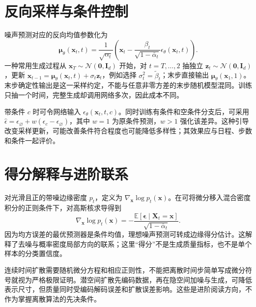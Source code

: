\documentclass[UTF8,12pt,a4paper,fontset=fandol]{ctexbook}
\begin{document}
\section{反向采样与条件控制}
噪声预测对应的反向均值参数化为
\begin{equation}
\boldsymbol\mu_\theta(\mathbf x_t,t)=\frac1{\sqrt{\alpha_t}}
\left(\mathbf x_t-\frac{\beta_t}{\sqrt{1-\bar\alpha_t}}\epsilon_\theta(\mathbf x_t,t)\right).
\label{eq:dl-diffusion-reverse}
\end{equation}
一种常用生成过程从 $\mathbf x_T\sim\mathcal N(\mathbf0,\mathbf I_d)$ 开始，对 $t=T,\ldots,2$ 抽独立 $\mathbf z_t\sim\mathcal N(\mathbf0,\mathbf I_d)$，更新 $\mathbf x_{t-1}=\boldsymbol\mu_\theta(\mathbf x_t,t)+\sigma_t\mathbf z_t$，例如选择 $\sigma_t^2=\widetilde\beta_t$；末步直接输出 $\boldsymbol\mu_\theta(\mathbf x_1,1)$。末步确定性输出是这一采样约定，不能与任意非零方差的末步随机模型混同。训练只抽一个时间，完整生成却调用网络多次，因此成本不同。

带条件 $c$ 时可令网络输入 $\epsilon_\theta(\mathbf x_t,t,c)$。同时训练有条件和空条件分支后，可采用 $\widehat\epsilon=\epsilon_{\varnothing}+w(\epsilon_c-\epsilon_{\varnothing})$，其中 $w=1$ 为原条件预测，$w>1$ 强化该差异。这种引导改变采样更新，可能改善条件符合程度也可能降低多样性；其效果应与日程、步数和条件一起评价。

\section{得分解释与进阶联系}
对光滑且正的带噪边缘密度 $p_t$，定义为 $\nabla_{\mathbf x}\log p_t(\mathbf x)$。在可将微分移入混合密度积分的正则条件下，对高斯核求导得到
\[
\nabla_{\mathbf x}\log p_t(\mathbf x)
=-\frac{\mathbb E[\boldsymbol\epsilon\mid\mathbf X_t=\mathbf x]}{\sqrt{1-\bar\alpha_t}}.
\]
因为均方误差的最优预测器是条件均值，理想噪声预测可转成边缘得分估计。这解释了去噪与概率密度局部方向的联系；这里“得分”不是生成质量指标，也不是单个样本的分类置信度。

连续时间扩散需要随机微分方程和相应正则性，不能把离散时间步简单写成微分符号就视为严格极限证明。潜空间扩散先编码数据，再在隐空间加噪与生成，可降低表示尺寸，但质量同时受编码解码误差和扩散误差影响。这些是进阶阅读方向，不作为掌握离散算法的先决条件。
\end{document}
